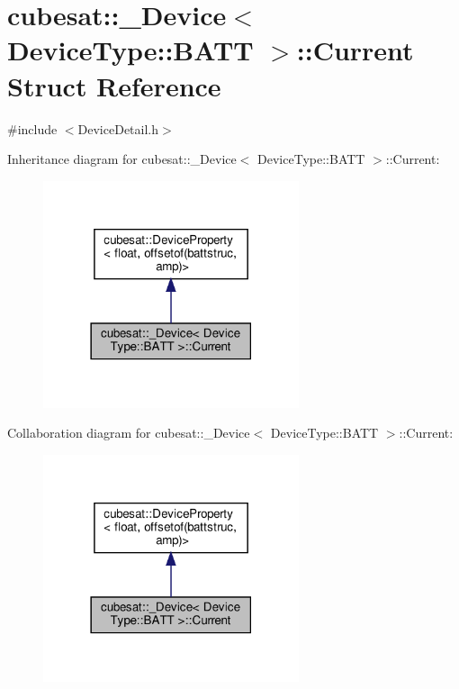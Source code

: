\hypertarget{structcubesat_1_1__Device_3_01DeviceType_1_1BATT_01_4_1_1Current}{}\section{cubesat\+:\+:\+\_\+\+Device$<$ Device\+Type\+:\+:B\+A\+TT $>$\+:\+:Current Struct Reference}
\label{structcubesat_1_1__Device_3_01DeviceType_1_1BATT_01_4_1_1Current}


{\ttfamily \#include $<$Device\+Detail.\+h$>$}



Inheritance diagram for cubesat\+:\+:\+\_\+\+Device$<$ Device\+Type\+:\+:B\+A\+TT $>$\+:\+:Current\+:\nopagebreak
\begin{figure}[H]
\begin{center}
\leavevmode
\includegraphics[width=213pt]{structcubesat_1_1__Device_3_01DeviceType_1_1BATT_01_4_1_1Current__inherit__graph}
\end{center}
\end{figure}


Collaboration diagram for cubesat\+:\+:\+\_\+\+Device$<$ Device\+Type\+:\+:B\+A\+TT $>$\+:\+:Current\+:\nopagebreak
\begin{figure}[H]
\begin{center}
\leavevmode
\includegraphics[width=213pt]{structcubesat_1_1__Device_3_01DeviceType_1_1BATT_01_4_1_1Current__coll__graph}
\end{center}
\end{figure}
